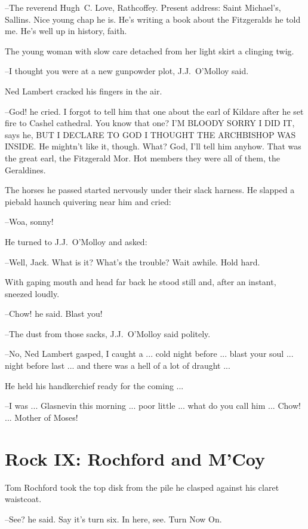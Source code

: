 --The reverend Hugh~C. Love, Rathcoffey.
Present address:
Saint Michael's, Sallins.
Nice young chap he is.
He's writing a book about the Fitzgeralds
he told me.
He's well up in history, faith.

The young woman with slow care
detached from her light skirt a clinging twig.

--I thought you were at a new gunpowder plot,
J.J.~O'Molloy said.

Ned Lambert cracked his fingers in the air.

--God!
he cried.
I forgot to tell him that one about the earl of Kildare
after he set fire to Cashel cathedral.
You know that one? I'M BLOODY SORRY
I DID IT,
says he,
BUT I DECLARE TO GOD I THOUGHT THE ARCHBISHOP WAS
INSIDE.
He mightn't like it, though.
What?
God, I'll tell him anyhow.
That was the great earl, the Fitzgerald Mor.
Hot members they were all of
them, the Geraldines.

The horses he passed
started nervously
under their slack harness.
He slapped a piebald haunch quivering near him
and cried:

--Woa, sonny!

He turned to J.J.~O'Molloy and asked:

--Well, Jack.
What is it?
What's the trouble?
Wait awhile.
Hold hard.

With gaping mouth and head far back
he stood still and, after an
instant,
sneezed loudly.

--Chow!
he said.
Blast you!

--The dust from those sacks,
J.J.~O'Molloy said politely.

--No,
Ned Lambert gasped,
I caught a ...
cold night before ...
blast your soul ...
night before last ...
and there was a hell of a lot of draught ...

He held his handkerchief ready for the coming ...

--I was ...
Glasnevin this morning ...
poor little ...
what do you call him ...
Chow! ...
Mother of Moses!


\section*{Rock IX: Rochford and M'Coy}


Tom Rochford took the top disk from the pile
he clasped against his claret waistcoat.

--See?
he said.
Say it's turn six.
In here, see.
Turn Now On.

